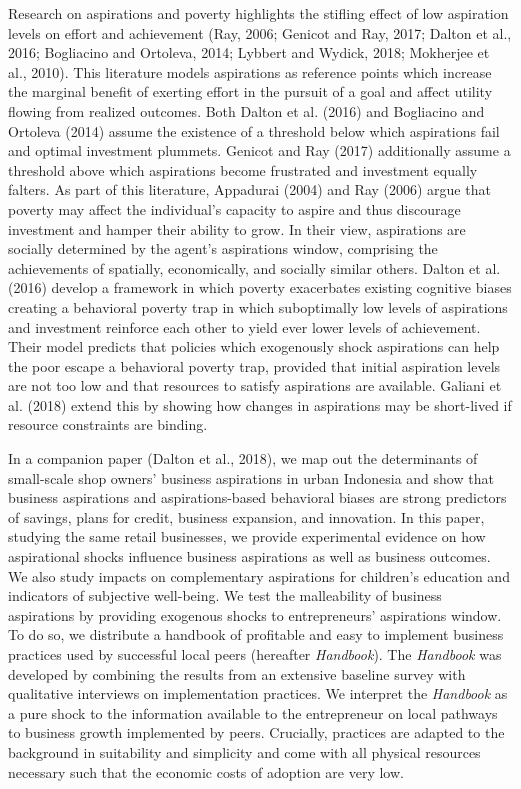 \documentclass[11.5pt]{article}
\begin{document}
Research on aspirations and poverty highlights the stifling effect of low aspiration levels on effort and achievement (Ray, 2006; Genicot and Ray, 2017; Dalton et al., 2016; Bogliacino and Ortoleva, 2014; Lybbert and Wydick, 2018; Mokherjee et al., 2010). This literature models aspirations as reference points which increase the marginal benefit of exerting effort in the pursuit of a goal and affect utility flowing from realized outcomes. Both Dalton et al. (2016) and Bogliacino and Ortoleva (2014) assume the existence of a threshold below which aspirations fail and optimal investment plummets. Genicot and Ray (2017) additionally assume a threshold above which aspirations become frustrated and investment equally falters. As part of this literature, Appadurai (2004) and Ray (2006) argue that poverty may affect the individual's capacity to aspire and thus discourage investment and hamper their ability to grow. In their view, aspirations are socially determined by the agent's aspirations window, comprising the achievements of spatially, economically, and socially similar others. Dalton et al. (2016) develop a framework in which poverty exacerbates existing cognitive biases creating a behavioral poverty trap in which suboptimally low levels of aspirations and investment reinforce each other to yield ever lower levels of achievement. Their model predicts that policies which exogenously shock aspirations can help the poor escape a behavioral poverty trap, provided that initial aspiration levels are not too low and that resources to satisfy aspirations are available. Galiani et al. (2018) extend this by showing how changes in aspirations may be short-lived if resource constraints are binding.

In a companion paper (Dalton et al., 2018), we map out the determinants of small-scale shop owners' business aspirations in urban Indonesia and show that business aspirations and aspirations-based behavioral biases are strong predictors of savings, plans for credit, business expansion, and innovation. In this paper, studying the same retail businesses, we provide experimental evidence on how aspirational shocks influence business aspirations as well as business outcomes. We also study impacts on complementary aspirations for children's education and indicators of subjective well-being. We test the malleability of business aspirations by providing exogenous shocks to entrepreneurs' aspirations window. To do so, we distribute a handbook of profitable and easy to implement business practices used by successful local peers (hereafter \emph{Handbook}). The \emph{Handbook} was developed by combining the results from an extensive baseline survey with qualitative interviews on implementation practices. We interpret the \emph{Handbook} as a pure shock to the information available to the entrepreneur on local pathways to business growth implemented by peers. Crucially, practices are adapted to the background in suitability and simplicity and come with all physical resources necessary such that the economic costs of adoption are very low. 
\end{document}
